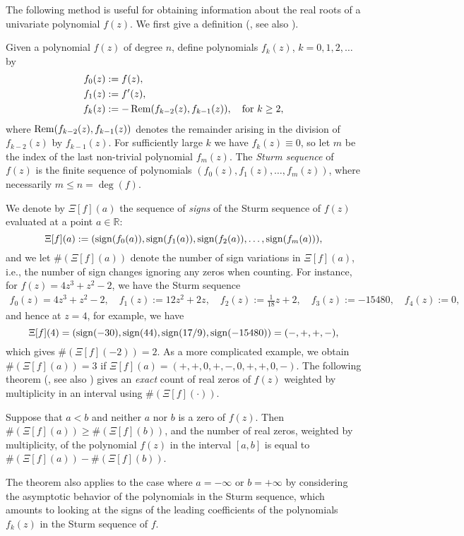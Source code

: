 The following method is useful for obtaining information about the real roots of a univariate polynomial $f(z)$. We first give a definition (\cite{Sturm1829}, see also \cite[Section 1.3]{Sturmfels02}).
\begin{definition}
Given a polynomial $f(z)$ of degree $n$, define polynomials $f_k(z)$, $k=0,1,2,\dots$ by
\begin{equation}
\begin{split}
f_0(z) &:= f(z),\\
f_1(z) &:= f'(z),\\
f_k(z) &:= -\operatorname{Rem}(f_{k-2}(z), f_{k-1}(z)),\quad \text{for $k\geq 2$},
\end{split}
\end{equation}
where $\operatorname{Rem}(f_{k-2}(z), f_{k-1}(z))$ denotes the remainder arising in the division of $f_{k-2}(z)$ by $f_{k-1}(z)$. For sufficiently large $k$ we have $f_k(z)\equiv 0$, so let $m$ be the index of the last non-trivial polynomial $f_m(z)$. The \emph{Sturm sequence} of $f(z)$ is the finite sequence of polynomials $(f_0(z), f_1(z),\ldots, f_m(z))$, where necessarily $m\leq n = \deg(f)$.
\label{def:Sturm-sequence}
\end{definition}
We denote by $\Xi[f](a)$ the sequence of \emph{signs} of the Sturm sequence of $f(z)$ evaluated at a point $a\in\mathbb{R}$:
\begin{equation}
\Xi[f](a) := (\operatorname{sign}(f_0(a)),\operatorname{sign}(f_1(a)),\operatorname{sign}(f_2(a)),\ldots, \operatorname{sign}(f_m(a)) ),
\end{equation}
and we let $\#(\Xi[f](a))$ denote the number of sign variations in $\Xi[f](a)$, i.e., the number of sign changes ignoring any zeros when counting. For instance, for $f(z)=4z^3 + z^2 -2$, we have the Sturm sequence
\begin{align}
f_0(z)=4z^3 + z^2 -2,\quad
f_1(z):=12 z^2 +2z,\quad
f_2(z):= \frac{1}{18}z +2,\quad
f_3(z):=-15480,\quad
f_4(z):=0,
\end{align}
and hence at $z=4$, for example, we have
\begin{equation}
 \Xi[f](4) = (\operatorname{sign}(-30), \operatorname{sign}(44), \operatorname{sign}(17/9), \operatorname{sign}(-15480))=(-,+,+,-),
\end{equation}
which gives $\#(\Xi[f](-2))=2$. As a more complicated example, we obtain $\#(\Xi[f](a))= 3$ if $\Xi[f](a)=(+,+,0,+,-,0,+,+,0,-)$. The following theorem (\cite{Sturm1829}, see also \cite[Theorem 1.4]{Sturmfels02}) gives an \emph{exact} count of real zeros of $f(z)$ weighted by multiplicity in an interval using $\#(\Xi[f](\cdot))$.
\begin{theorem} Suppose that $a<b$ and neither $a$ nor $b$ is a zero of $f(z)$. Then $\#(\Xi[f](a))\geq \#(\Xi[f](b))$, and the number of real zeros, weighted by multiplicity, of the polynomial $f(z)$ in the interval $[a,b]$ is equal to $\#(\Xi[f](a)) - \#(\Xi[f](b))$.
\label{t:Sturm}
\end{theorem}
The theorem also applies to the case where $a=-\infty$ or $b=+\infty$ by considering the asymptotic behavior of the polynomials in the Sturm sequence, which amounts to looking at the signs of the leading coefficients of the polynomials $f_k(z)$ in the Sturm sequence of $f$.

